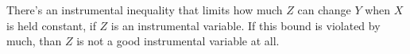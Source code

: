 There's an instrumental inequality that limits how much $Z$ can change $Y$ when $X$ is held constant, if $Z$ is an instrumental variable. If this bound is violated by much, than $Z$ is not a good instrumental variable at all.


